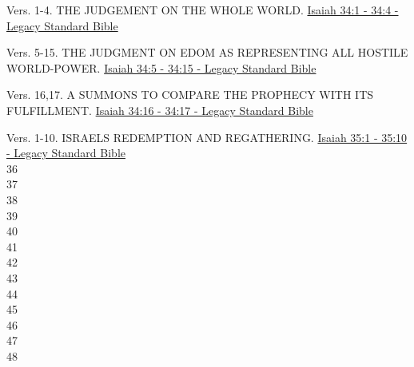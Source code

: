 \documentclass[
  ignorenonframetext,
]{beamer}
\begin{document}
\begin{frame}{34}
\label{section-64}
\begin{block}{Vers. 1-4. THE JUDGEMENT ON THE WHOLE WORLD.}
\label{vers.-1-4.-the-judgement-on-the-whole-world.}
\href{https://read.lsbible.org/?q=isa34\%3A1-4}{Isaiah 34:1 - 34:4 -
Legacy Standard Bible}
\end{block}

\begin{block}{Vers. 5-15. THE JUDGMENT ON EDOM AS REPRESENTING ALL
HOSTILE WORLD-POWER.}
\label{vers.-5-15.-the-judgment-on-edom-as-representing-all-hostile-world-power.}
\href{https://read.lsbible.org/?q=isa34\%3A5-15}{Isaiah 34:5 - 34:15 -
Legacy Standard Bible}
\end{block}

\begin{block}{Vers. 16,17. A SUMMONS TO COMPARE THE PROPHECY WITH ITS
FULFILLMENT.}
\label{vers.-1617.-a-summons-to-compare-the-prophecy-with-its-fulfillment.}
\href{https://read.lsbible.org/?q=isa34\%3A16-17}{Isaiah 34:16 - 34:17 -
Legacy Standard Bible}
\end{block}
\end{frame}

\begin{frame}{35}
\label{section-65}
\begin{block}{Vers. 1-10. ISRAEL\textquotesingle S REDEMPTION AND
REGATHERING.}
\label{vers.-1-10.-israels-redemption-and-regathering.}
\href{https://read.lsbible.org/?q=isa35\%3A1-10}{Isaiah 35:1 - 35:10 -
Legacy Standard Bible}\\
36\\
37\\
38\\
39\\
40\\
41\\
42\\
43\\
44\\
45\\
46\\
47\\
48
\end{block}
\end{frame}
\end{document}
